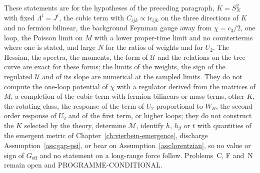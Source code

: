 These statements are for the hypotheses of the preceding paragraph, \(K=S^2_N\) with fixed \(\Lambda^i=J^i\), the cubic term with \(C_{ijk}\propto\mathrm i\epsilon_{ijk}\) on the three directions of \(K\) and no fermion bilinear, the background Feynman gauge away from \(\chi=c_3/2\), one loop, the Poisson limit on \(M\) with a lower proper-time limit and no counterterms where one is stated, and large \(N\) for the ratios of weights and for \(U_2\). The Hessian, the spectra, the moments, the form of \(\mathcal U\) and the relations on the tree curve are exact for these forms; the limits of the weights, the sign of the regulated \(\mathcal U\) and of its slope are numerical at the sampled limits. They do not compute the one-loop potential of \(\chi\) with a regulator derived from the matrices of \(M\), a completion of the cubic term with fermion bilinears or mass terms, other \(K\), the rotating class, the response of the term of \(U_2\) proportional to \(W_R\), the second-order response of \(U_2\) and of the first term, or higher loops; they do not construct the \(K\) selected by the theory, determine \(\mathcal M\), identify \(\bar h\), \(h_\beta\) or \(t\) with quantities of the emergent metric of Chapter~\ref{ch:vierbein-emergence}, discharge Assumption~\ref{ass:gap-psi}, or bear on Assumption~\ref{ass:lorentzian}, so no value or sign of \(G_{\mathrm{eff}}\) and no statement on a long-range force follow. Problems~C, F and~N remain open and PROGRAMME-CONDITIONAL.

